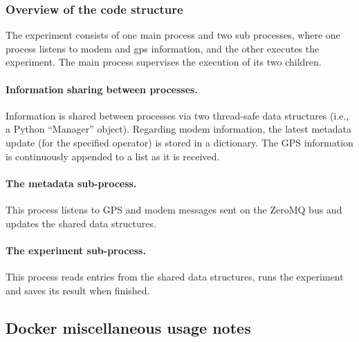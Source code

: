 \documentclass[a4paper,10pt]{article}
\begin{document}
\subsubsection{Overview of the code structure}

The experiment consists of one main process and two sub processes, where one process listens to modem and gps information, and the other executes the experiment.
The main process supervises the execution of its two children.

\paragraph{Information sharing between processes.}
Information is shared between processes via two thread-safe data structures (i.e., a Python ``Manager'' object).
Regarding modem information, the latest metadata update (for the specified operator) is stored in a dictionary.
The GPS information is continuously appended to a list as it is received.

\paragraph{The metadata sub-process.}
This process listens to GPS and modem messages sent on the ZeroMQ bus and updates the shared data structures.

\paragraph{The experiment sub-process.}
This process reads entries from the shared data structures, runs the experiment and saves its result when finished.

\subsection{Docker miscellaneous usage notes}
\end{document}

